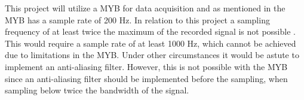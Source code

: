 This project will utilize a MYB for data acquisition and as mentioned in  the MYB has a sample rate of 200 Hz. In relation to this project a sampling frequency of at least twice the maximum of the recorded signal is not possible \cite{Cram2012}. This would require a sample rate of at least 1000 Hz, which cannot be achieved due to limitations in the MYB. Under other circumstances it would be astute to implement an anti-aliasing filter. However, this is not possible with the MYB since an anti-aliasing filter should be implemented before the sampling, when sampling below twice the bandwidth of the signal. %


